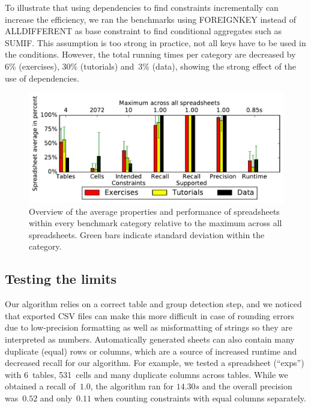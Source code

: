 To illustrate that using dependencies to find constraints incrementally can increase the efficiency, we ran the benchmarks using FOREIGNKEY instead of ALLDIFFERENT as base constraint to find conditional aggregates such as SUMIF. This assumption is too strong in practice, not all keys have to be used in the conditions. However, the total running times per category are decreased by 6\% (exercises), 30\% (tutorials) and~3\% (data), showing the strong effect of the use of dependencies.

\begin{figure}[t]
  \centering
  \includegraphics[width=1\linewidth]{figures/comparison.pdf}
  \caption{Overview of the average properties and performance of spreadsheets within every benchmark category relative to the maximum across all spreadsheets.
  Green bars indicate standard deviation within the category.}
  \label{fig:comparison}
\end{figure}

\subsection{Testing the limits}
Our algorithm relies on a correct table and group detection step, and we noticed that exported CSV files can make this more difficult in case of rounding errors due to low-precision formatting as well as misformatting of strings so they are interpreted as numbers.
Automatically generated sheets can also contain many duplicate (equal) rows or columns, which are a source of increased runtime and decreased recall for our algorithm. For example, we tested a spreadsheet (``exps'') with 6~tables, 531~cells and many duplicate columns across tables.
While we obtained a recall of~$1.0$, the algorithm ran for $14.30s$ and the overall precision was~$0.52$ and only~$0.11$ when counting constraints with equal columns separately.






